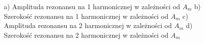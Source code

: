 \documentclass[a4paper,10pt,twoside]{report}
\begin{document}
\begin{figure}[h!]
\centering
{}


\caption{ a) Amplituda rezonansu na 1 harmonicznej w zależności od $A_m$ b) Szerokość rezonansu na 1 harmonicznej w zależności od $A_m$ 
c) Amplituda rezonansu na 2 harmonicznej w zależności od $A_m$ d) Szerokość rezonansu na 2 harmonicznej w zależności od $A_m$}
\label{wykresikioda}
\end{figure}

\end{document}
